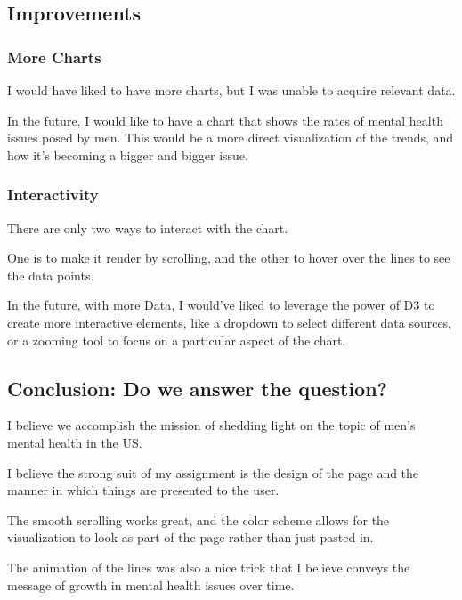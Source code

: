 \documentclass{article}
\begin{document}
\subsection{Improvements}
\label{subsec:Improvements}

\subsubsection{More Charts}
\label{subsubsec:More Charts}

I would have liked to have more charts, but I was unable to acquire relevant data.

In the future, I would like to have a chart that shows the rates of mental
health issues posed by men. This would be a more direct visualization of the
trends, and how it's becoming a bigger and bigger issue. 

\subsubsection{Interactivity}
\label{subsubsec:Interactivity}

There are only two ways to interact with the chart. 

One is to make it render by scrolling, 
and the other to hover over the lines to see the data points.

In the future, with more Data, I would've liked to leverage the power of D3
to create more interactive elements, like a dropdown to select different
data sources, or a zooming tool to focus on a particular aspect of the chart.

\subsection{Conclusion: Do we answer the question?}
\label{subsec:Conclusion}

I believe we accomplish the mission of shedding light on the topic
of men's mental health in the US. 

I believe the strong suit of my assignment is the design of the 
page and the manner in which things are presented to the user.

The smooth scrolling works great,
and the color scheme allows for the visualization to look as part of 
the page rather than just pasted in.

The animation of the lines was also a nice trick that I believe
conveys the message of growth in mental health issues over time.
\end{document}
